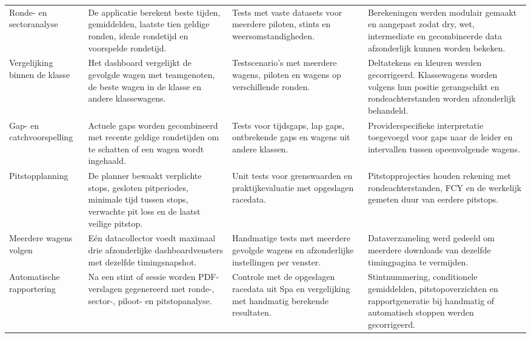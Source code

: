 \begin{longtable}{@{}
  >{\raggedright\arraybackslash}p{2.8cm}
  >{\raggedright\arraybackslash}p{3.5cm}
  >{\raggedright\arraybackslash}p{3.5cm}
  >{\raggedright\arraybackslash}p{3.2cm}
@{}}
\addlinespace
Ronde- en sectoranalyse &
De applicatie berekent beste tijden, gemiddelden, laatste tien geldige ronden, ideale rondetijd en voorspelde rondetijd. &
Tests met vaste datasets voor meerdere piloten, stints en weersomstandigheden. &
Berekeningen werden modulair gemaakt en aangepast zodat dry, wet, intermediate en gecombineerde data afzonderlijk kunnen worden bekeken. \\

\addlinespace
Vergelijking binnen de klasse &
Het dashboard vergelijkt de gevolgde wagen met teamgenoten, de beste wagen in de klasse en andere klassewagens. &
Testscenario's met meerdere wagens, piloten en wagens op verschillende ronden. &
Deltatekens en kleuren werden gecorrigeerd. Klassewagens worden volgens hun positie gerangschikt en rondeachterstanden worden afzonderlijk behandeld. \\

\addlinespace
Gap- en catchvoorspelling &
Actuele gaps worden gecombineerd met recente geldige rondetijden om te schatten of een wagen wordt ingehaald. &
Tests voor tijdsgaps, lap gaps, ontbrekende gaps en wagens uit andere klassen. &
Providerspecifieke interpretatie toegevoegd voor gaps naar de leider en intervallen tussen opeenvolgende wagens. \\

\addlinespace
Pitstopplanning &
De planner bewaakt verplichte stops, gesloten pitperiodes, minimale tijd tussen stops, verwachte pit loss en de laatst veilige pitstop. &
Unit tests voor grenswaarden en praktijkevaluatie met opgeslagen racedata. &
Pitstopprojecties houden rekening met rondeachterstanden, FCY en de werkelijk gemeten duur van eerdere pitstops. \\

\addlinespace
Meerdere wagens volgen &
Eén datacollector voedt maximaal drie afzonderlijke dashboardvensters met dezelfde timingsnapshot. &
Handmatige tests met meerdere gevolgde wagens en afzonderlijke instellingen per venster. &
Dataverzameling werd gedeeld om meerdere downloads van dezelfde timingpagina te vermijden. \\

\addlinespace
Automatische rapportering &
Na een stint of sessie worden PDF-verslagen gegenereerd met ronde-, sector-, piloot- en pitstopanalyse. &
Controle met de opgeslagen racedata uit Spa en vergelijking met handmatig berekende resultaten. &
Stintnummering, conditionele gemiddelden, pitstopoverzichten en rapportgeneratie bij handmatig of automatisch stoppen werden gecorrigeerd. \\


\end{longtable}
